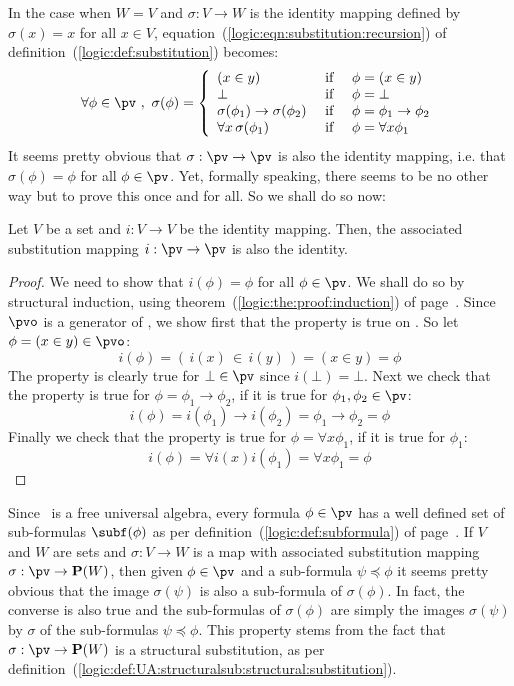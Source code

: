 In the case when $W=V$ and $\sigma:V\to W$ is the identity mapping
defined by $\sigma(x)=x$ for all $x\in V$,
equation~(\ref{logic:eqn:substitution:recursion}) of
definition~(\ref{logic:def:substitution}) becomes:
    \[
        \forall\phi\in\pv\ ,\ \sigma(\phi)
        =
        \left\{\begin{array}{lcl}
            (x\in y)&\mbox{\ if\ }&\phi=(x\in y)
            \\
            \bot&\mbox{\ if\ }&\phi=\bot
            \\
            \sigma(\phi_{1})\to \sigma(\phi_{2}) 
                &\mbox{\ if\ }&
            \phi=\phi_{1}\to\phi_{2}
            \\
            \forall x\,\sigma(\phi_{1})&\mbox{\ if\ }&\phi=\forall x\phi_{1}
        \end{array}\right.
    \]
It seems pretty obvious that $\sigma:\pv\to\pv$ is also the identity
mapping, i.e. that $\sigma(\phi)=\phi$ for all $\phi\in\pv$. Yet,
formally speaking, there seems to be no other way but to prove this
once and for all. So we shall do so now:
\begin{prop}\label{logic:prop:substitution:identity}
    Let $V$ be a set and $i:V\to V$ be the identity mapping. Then, the
    associated substitution mapping $i:\pv\to\pv$ is also the identity.
\end{prop}
\begin{proof}
We need to show that $i(\phi)=\phi$ for all $\phi\in\pv$. We shall
do so by structural induction, using
theorem~(\ref{logic:the:proof:induction}) of
page~\pageref{logic:the:proof:induction}. Since $\pvo$ is a
generator of \pv, we show first that the property is true on \pvo.
So let $\phi = (x\in y)\in\pvo$:
    \[
        i(\phi)
        =
        (\,i(x)\,\in\,i(y)\,)
        =
        (x\in y)
        =
        \phi
    \]
The property is clearly true for $\bot\in\pv$ since $i(\bot)=\bot$.
Next we check that the property is true for
$\phi=\phi_{1}\to\phi_{2}$, if it is true for $\phi_{1},\phi_{2}\in\pv$:
    \[
        i(\phi)
        =
        i(\phi_{1})\to i(\phi_{2})
        =
        \phi_{1}\to\phi_{2}
        =
        \phi
    \]
Finally we check that the property is true for $\phi=\forall
x\phi_{1}$, if it is true for $\phi_{1}$:
    \[
        i(\phi)
        =
        \forall i(x)i(\phi_{1})
        =
        \forall x\phi_{1}
        =
        \phi
    \]
\end{proof}

Since \pv\ is a free universal algebra, every formula $\phi\in\pv$
has a well defined set of sub-formulas $\subf(\phi)$ as per
definition~(\ref{logic:def:subformula}) of
page~\pageref{logic:def:subformula}. If $V$ and $W$ are sets and
$\sigma:V\to W$ is a map with associated substitution mapping
$\sigma:\pv\to{\bf P}(W)$, then given $\phi\in\pv$ and a sub-formula
$\psi\preceq\phi$ it seems pretty obvious that the image
$\sigma(\psi)$ is also a sub-formula of $\sigma(\phi)$. In fact, the
converse is also true and the sub-formulas of $\sigma(\phi)$ are
simply the images $\sigma(\psi)$ by $\sigma$ of the sub-formulas
$\psi\preceq\phi$. This property stems from the fact that
$\sigma:\pv\to{\bf P}(W)$ is a structural substitution, as per
definition~(\ref{logic:def:UA:structuralsub:structural:substitution}).

